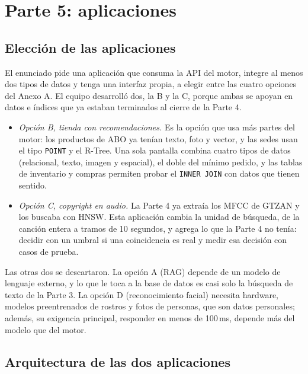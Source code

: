 \documentclass[11pt,a4paper]{article}
\begin{document}
\section{Parte 5: aplicaciones}
\label{sec:parte5}

\subsection{Elección de las aplicaciones}

El enunciado pide una aplicación que consuma la API del motor, integre al menos dos tipos de datos y tenga una interfaz propia, a elegir entre las cuatro opciones del Anexo A. El equipo desarrolló dos, la B y la C, porque ambas se apoyan en datos e índices que ya estaban terminados al cierre de la Parte 4.

\begin{itemize}
  \item \emph{Opción B, tienda con recomendaciones.} Es la opción que usa más partes del motor: los productos de ABO ya tenían texto, foto y vector, y las sedes usan el tipo \texttt{POINT} y el R-Tree. Una sola pantalla combina cuatro tipos de datos (relacional, texto, imagen y espacial), el doble del mínimo pedido, y las tablas de inventario y compras permiten probar el \texttt{INNER JOIN} con datos que tienen sentido.
  \item \emph{Opción C, copyright en audio.} La Parte 4 ya extraía los MFCC de GTZAN y los buscaba con HNSW. Esta aplicación cambia la unidad de búsqueda, de la canción entera a tramos de 10 segundos, y agrega lo que la Parte 4 no tenía: decidir con un umbral si una coincidencia es real y medir esa decisión con casos de prueba.
\end{itemize}

Las otras dos se descartaron. La opción A (RAG) depende de un modelo de lenguaje externo, y lo que le toca a la base de datos es casi solo la búsqueda de texto de la Parte 3. La opción D (reconocimiento facial) necesita hardware, modelos preentrenados de rostros y fotos de personas, que son datos personales; además, su exigencia principal, responder en menos de 100\,ms, depende más del modelo que del motor.

\subsection{Arquitectura de las dos aplicaciones}
\end{document}
